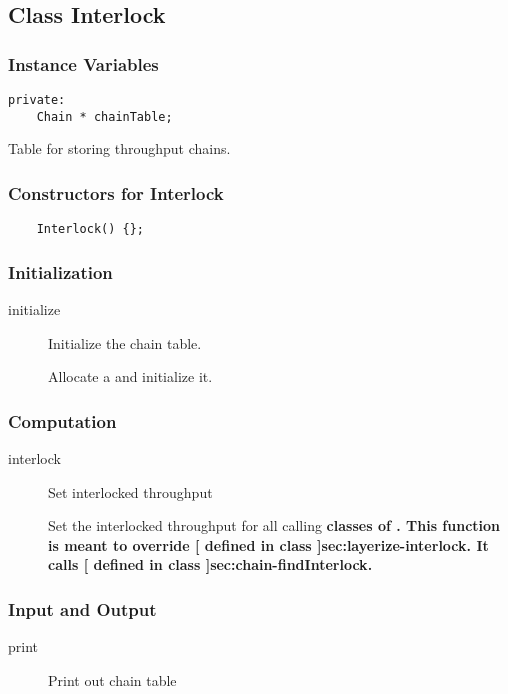 \htmlrule
\subsection{Class Interlock}
\label{sec:interlock}

\subsubsection{Instance Variables}
\label{sec: -ivars}
\begin{verbatim}
private:
    Chain * chainTable;
\end{verbatim}

\begin{description}
\label{sec:interlock-interlock}
\item[chainTable] \texonly{---} Table for storing throughput chains.
\end{description}

\subsubsection{Constructors for Interlock}

\begin{verbatim}
    Interlock() {};
\end{verbatim}

\subsubsection{Initialization}
\begin{description}
\item[initialize] \texonly{---} Initialize the chain table.\\

Allocate a  and initialize it.

\end{description}

\subsubsection{Computation}

\begin{description}
\item[interlock] \texonly{---} Set interlocked throughput \\

Set the interlocked throughput for all calling \bf{classes} of
.  This function is meant to override
[ defined in class
]{sec:layerize-interlock}.  It calls
[ defined in class ]{sec:chain-findInterlock}.

\end{description}

\subsubsection{Input and Output}
\begin{description}
\item[print] \texonly{---} Print out chain table\\

\end{description}
